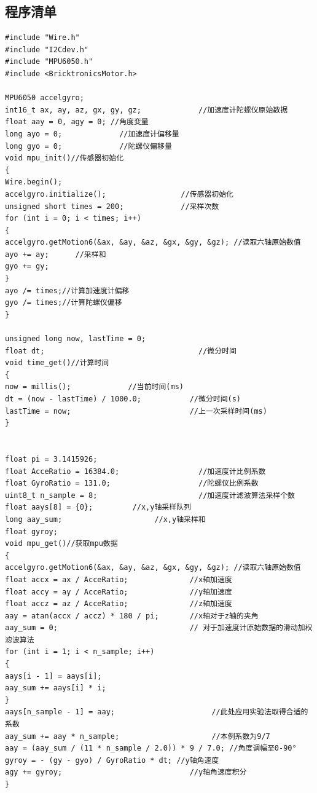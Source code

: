\documentclass[a4paper]{ctexart}
\begin{document}
\newpage
{}
\renewcommand{\thesection}{附录\Alph{section}.} 
\begin{appendices}
\section{程序清单}
\begin{lstlisting}
#include "Wire.h"
#include "I2Cdev.h"
#include "MPU6050.h"
#include <BricktronicsMotor.h>

MPU6050 accelgyro;
int16_t ax, ay, az, gx, gy, gz;             //加速度计陀螺仪原始数据
float aay = 0, agy = 0; //角度变量
long ayo = 0;             //加速度计偏移量
long gyo = 0;             //陀螺仪偏移量
void mpu_init()//传感器初始化
{
Wire.begin();
accelgyro.initialize();                 //传感器初始化
unsigned short times = 200;             //采样次数
for (int i = 0; i < times; i++)
{
accelgyro.getMotion6(&ax, &ay, &az, &gx, &gy, &gz); //读取六轴原始数值
ayo += ay;      //采样和
gyo += gy;
}
ayo /= times;//计算加速度计偏移
gyo /= times;//计算陀螺仪偏移
}

unsigned long now, lastTime = 0;
float dt;                                   //微分时间
void time_get()//计算时间
{
now = millis();             //当前时间(ms)
dt = (now - lastTime) / 1000.0;           //微分时间(s)
lastTime = now;                           //上一次采样时间(ms)
}


float pi = 3.1415926;
float AcceRatio = 16384.0;                  //加速度计比例系数
float GyroRatio = 131.0;                    //陀螺仪比例系数
uint8_t n_sample = 8;                       //加速度计滤波算法采样个数
float aays[8] = {0};         //x,y轴采样队列
long aay_sum;                     //x,y轴采样和
float gyroy;
void mpu_get()//获取mpu数据
{
accelgyro.getMotion6(&ax, &ay, &az, &gx, &gy, &gz); //读取六轴原始数值
float accx = ax / AcceRatio;              //x轴加速度
float accy = ay / AcceRatio;              //y轴加速度
float accz = az / AcceRatio;              //z轴加速度
aay = atan(accx / accz) * 180 / pi;       //x轴对于z轴的夹角
aay_sum = 0;                              // 对于加速度计原始数据的滑动加权滤波算法
for (int i = 1; i < n_sample; i++)
{
aays[i - 1] = aays[i];
aay_sum += aays[i] * i;
}
aays[n_sample - 1] = aay;                      //此处应用实验法取得合适的系数
aay_sum += aay * n_sample;                     //本例系数为9/7
aay = (aay_sum / (11 * n_sample / 2.0)) * 9 / 7.0; //角度调幅至0-90°
gyroy = - (gy - gyo) / GyroRatio * dt; //y轴角速度
agy += gyroy;                             //y轴角速度积分
}



\end{lstlisting}
\end{appendices}
\end{document}
